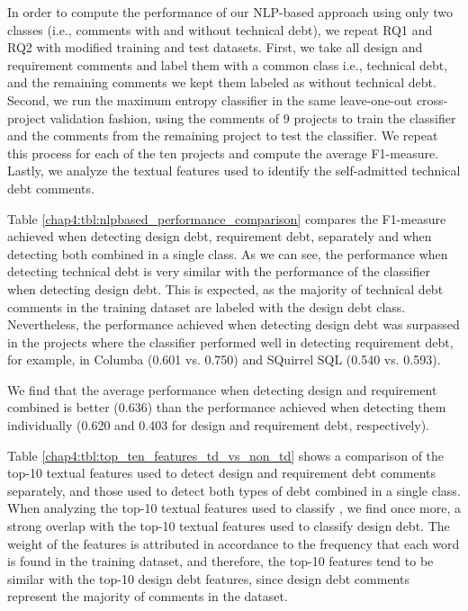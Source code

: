 In order to compute the performance of our NLP-based approach using only two classes (i.e., comments with and without technical debt), we repeat RQ1 and RQ2 with modified training and test datasets.
First, we take all design and requirement \SATD comments and label them with a common class i.e., technical debt, and the remaining comments we kept them labeled as without technical debt.
Second, we run the maximum entropy classifier in the same leave-one-out cross-project validation fashion, using the comments of 9 projects to train the classifier and the comments from the remaining project to test the classifier. We repeat this process for each of the ten projects and compute the average F1-measure. Lastly, we analyze the textual features used to identify the self-admitted technical debt comments.

Table \ref{chap4:tbl:nlpbased_performance_comparison} compares the F1-measure achieved when detecting design debt, requirement debt, separately and when detecting both combined in a single class. As we can see, the performance when detecting technical debt is very similar with the performance of the classifier when detecting design debt. This is expected, as the majority of technical debt comments in the training dataset are labeled with the design debt class. Nevertheless, the performance achieved when detecting design debt was surpassed in the projects where the classifier performed well in detecting requirement debt, for example, in Columba (0.601 vs. 0.750) and SQuirrel SQL (0.540 vs. 0.593). 

We find that the average performance when detecting design and requirement \SATD combined is better (0.636) than the performance achieved when detecting them individually (0.620 and 0.403 for design and requirement debt, respectively).

Table \ref{chap4:tbl:top_ten_features_td_vs_non_td} shows a comparison of the top-10 textual features used to detect design and requirement debt comments separately, and those used to detect both types of debt combined in a single class.
When analyzing the top-10 textual features used to classify \SATD, we find once more, a strong overlap with the top-10 textual features used to classify design debt. The weight of the features is attributed in accordance to the frequency that each word is found in the training dataset, and therefore, the top-10 features tend to be similar with the top-10 design debt features, since design debt comments represent the majority of \SATD comments in the dataset. 

